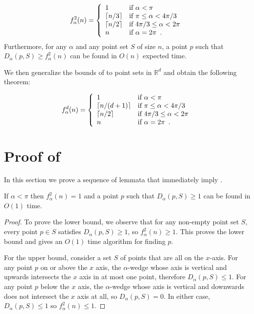 \documentclass[lotsofwhite]{patmorin}
\begin{document}
\begin{thm}
\[
   f^2_\alpha(n) = \left\{\begin{array}{ll}
                        1 & \mbox{if $\alpha < \pi$} \\
                        \left\lceil n/3 \right\rceil & \mbox{if $\pi\le \alpha < 4\pi/3$} \\
                        \left\lceil n/2 \right\rceil & \mbox{if $4\pi/3\le \alpha < 2\pi$} \\
                        n & \mbox{if $\alpha = 2\pi$\enspace .} 
                       \end{array}\right.
\]
Furthermore, for any $\alpha$ and any point set $S$ of size $n$, a
point $p$ such that $D_\alpha(p,S) \ge
f^2_\alpha(n)$ can be found in $O(n)$ expected time.
\end{thm}

We then generalize the bounds of  to point sets in
$\mathbb{R}^d$ and obtain the following theorem:

\begin{thm}
\[
   f^d_\alpha(n) = \left\{\begin{array}{ll}
                        1 & \mbox{if $\alpha < \pi$} \\
                        \left\lceil n/(d+1) \right\rceil & \mbox{if $\pi\le \alpha < 4\pi/3$} \\
                        \left\lceil n/2 \right\rceil & \mbox{if $4\pi/3\le \alpha < 2\pi$} \\
                        n & \mbox{if $\alpha = 2\pi$\enspace .} 
                       \end{array}\right.
\]
\end{thm} 

\section{Proof of }

In this section we prove a sequence of lemmata that immediately imply
.

\begin{lem}
If $\alpha < \pi$ then $f^2_\alpha(n) = 1$ and a point $p$ such that
$D_\alpha(p,S)\ge 1$ can be found in $O(1)$ time.
\end{lem}

\begin{proof}
To prove the lower bound, we observe that for any non-empty
point set $S$, every point $p\in S$ satisfies $D_\alpha(p,S)\ge 1$, so
$f^2_\alpha(n) \ge 1$. This proves the lower bound and gives an $O(1)$
time algorithm for finding $p$. 

For the upper bound, consider a set $S$ of points that are all
on the $x$-axis.  For any point $p$ on or above the $x$ axis, the
$\alpha$-wedge whose axis is vertical and upwards intersects the $x$
axis in at most one point, therefore $D_\alpha(p,S) \le 1$.  For any
point $p$ below the $x$ axis, the $\alpha$-wedge whose axis is
vertical and downwards does not intersect the $x$ axis at all, so
$D_\alpha(p,S)=0$.  In either case, $D_\alpha(p,S)\le 1$ so $f^2_\alpha(n)
\le 1$.
\end{proof}
\end{document}
